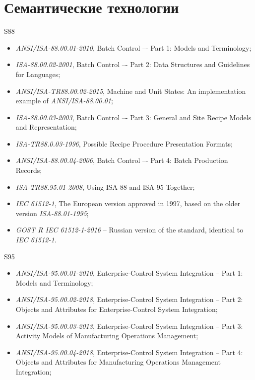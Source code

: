 \documentclass{beamer}
\begin{document}
 \section{Семантические технологии}
 {
    \begin{frame}{S88}
        \begin{itemize}
            \item \textit{ANSI/ISA-88.00.01-2010}, Batch Control –- Part 1: Models and Terminology;
            \item \textit{ISA-88.00.02-2001}, Batch Control –- Part 2: Data Structures and Guidelines for Languages;
            \item \textit{ANSI/ISA-TR88.00.02-2015}, Machine and Unit States: An implementation example of \textit{ANSI/ISA-88.00.01};
            \item \textit{ISA-88.00.03-2003}, Batch Control –- Part 3: General and Site Recipe Models and Representation;
            \item \textit{ISA-TR88.0.03-1996}, Possible Recipe Procedure Presentation Formats;
            \item \textit{ANSI/ISA-88.00.04-2006}, Batch Control –- Part 4: Batch Production Records;
            \item \textit{ISA-TR88.95.01-2008}, Using ISA-88 and ISA-95 Together;
            \item \textit{IEC 61512-1}, The European version approved in 1997, based on the older version \textit{ISA-88.01-1995};
            \item \textit{GOST R IEC 61512-1-2016} -- Russian version of the standard, identical to \textit{IEC 61512-1}.
        \end{itemize}
    \end{frame}

    \begin{frame}{S95}
        \begin{itemize}
            \item \textit {ANSI/ISA-95.00.01-2010}, Enterprise-Control System Integration -- Part 1: Models and Terminology;
            \item \textit {ANSI/ISA-95.00.02-2018}, Enterprise-Control System Integration -- Part 2: Objects and Attributes for Enterprise-Control System Integration;
            \item \textit {ANSI/ISA-95.00.03-2013}, Enterprise-Control System Integration -- Part 3: Activity Models of Manufacturing Operations Management;
            \item \textit {ANSI/ISA-95.00.04-2018}, Enterprise-Control System Integration -- Part 4: Objects and Attributes for Manufacturing Operations Management Integration;
        \end{itemize}
    \end{frame}

}
\end{document}
